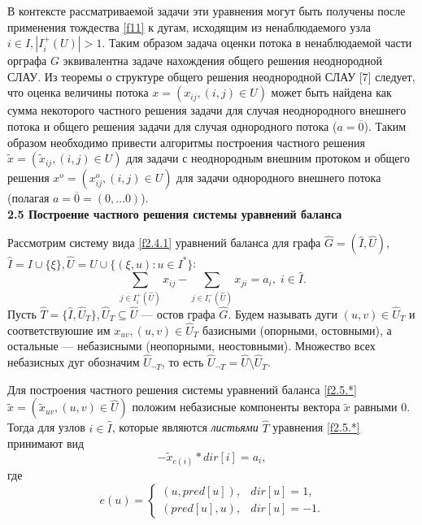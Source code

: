 \documentclass[14pt]{extarticle}%
\begin{document}
В контексте рассматриваемой задачи эти уравнения могут быть получены после применения тождества \eqref{f11} к дугам, исходящим из ненаблюдаемого узла $i\in I, |I^+_i(U)|>1$. Таким образом задача оценки потока в ненаблюдаемой части орграфа $G$ эквивалентна задаче нахождения общего решения неоднородной СЛАУ. Из теоремы о структуре общего решения неоднородной СЛАУ [7] следует, что оценка величины потока $x=(x_{ij}, (i,j)\in U)$ может быть найдена как сумма некоторого частного решения задачи для случая неоднородного внешнего потока и общего решения задачи для случая однородного потока ($a=\overline{0}$). Таким образом необходимо привести алгоритмы построения частного решения $\widetilde{x}=(\widetilde{x}_{ij}, (i,j)\in U)$ для задачи с неоднородным внешним протоком и общего решения $x^o=(x^o_{ij}, (i,j)\in U)$ для задачи однородного внешнего потока (полагая $a=\overline{0}=(0, \ldots 0)$).\\

\textbf{2.5 Построение частного решения системы уравнений баланса}

Рассмотрим систему вида \eqref{f2.4.1} уравнений баланса для графа $\widehat{G}=(\widehat{I},\widehat{U}),$ $\widehat{I}=I\cup\{\xi\}, \widehat{U}=U\cup\{(\xi,u):u\in I^*\}$:
\begin{equation}\label{f2.5.*}
    \sum_{j\in I^+_i(\widehat{U})} x_{ij}-\sum_{j\in I^-_i(\widehat{U})}x_{ji}=a_i,\; i\in \widehat{I}.
\end{equation}
 Пусть $\widehat{T}=\{\widehat{I},\widehat{U}_T\}, \widehat{U}_T\subseteq \widehat{U}$ --- остов графа $\widehat{G}$. Будем называть дуги $(u,v)\in \widehat{U}_T$ и соответствуюшие им $x_{uv}, (u,v)\in \widehat{U}_T$ базисными (опорными, остовными), а остальные --- небазисными (неопорными, неостовными). Множество всех небазисных дуг обозначим $\widehat{U}_{\neg T}$, то есть $\widehat{U}_{\neg T}=\widehat{U}\setminus \widehat{U}_T$. 

Для построения частного решения системы уравнений баланса \eqref{f2.5.*} $\widetilde x=(\widetilde{x}_{uv},(u,v)\in \widehat{U})$ положим небазисные компоненты вектора $\widetilde{x}$ равными $0$. Тогда для узлов $i\in \widehat{I}$, которые являются {\it листьями} $\widehat{T}$ уравнения \eqref{f2.5.*} принимают вид 
\begin{equation}\label{f241}
-\widetilde{x}_{e(i)}*dir[i]=a_i,
\end{equation}
где 
\begin{equation*}
e(u)=\left\{
\begin{matrix}
(u, pred[u]),& dir[u]=1,\\
(pred[u],u),& dir[u]=-1.
\end{matrix}
\right.
\end{equation*}
\end{document}
